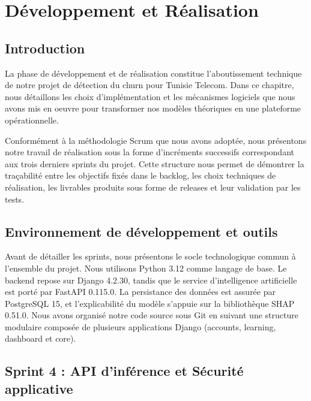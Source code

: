 
\chapter{Développement et Réalisation}

\section{Introduction}

La phase de développement et de réalisation constitue l'aboutissement technique de notre projet de détection du churn pour Tunisie Telecom. Dans ce chapitre, nous détaillons les choix d'implémentation et les mécanismes logiciels que nous avons mis en oeuvre pour transformer nos modèles théoriques en une plateforme opérationnelle.

Conformément à la méthodologie Scrum que nous avons adoptée, nous présentons notre travail de réalisation sous la forme d'incréments successifs correspondant aux trois derniers sprints du projet. Cette structure nous permet de démontrer la traçabilité entre les objectifs fixés dans le backlog, les choix techniques de réalisation, les livrables produits sous forme de releases et leur validation par les tests.

\section{Environnement de développement et outils}

Avant de détailler les sprints, nous présentons le socle technologique commun à l'ensemble du projet. Nous utilisons Python 3.12 comme langage de base. Le backend repose sur Django 4.2.30, tandis que le service d'intelligence artificielle est porté par FastAPI 0.115.0. La persistance des données est assurée par PostgreSQL 15, et l'explicabilité du modèle s'appuie sur la bibliothèque SHAP 0.51.0. Nous avons organisé notre code source sous Git en suivant une structure modulaire composée de plusieurs applications Django (accounts, learning, dashboard et core).

\section{Sprint 4 : API d'inférence et Sécurité applicative}

